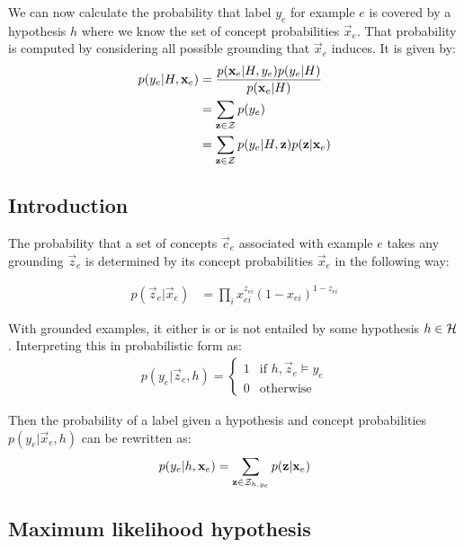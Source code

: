 We can now calculate the probability that label $y_e$ for example $e$ is covered by a hypothesis $h$ where we know the set of concept probabilities $\vec{x}_e$.
That probability is computed by considering all possible grounding that $\vec{x}_e$ induces.
It is given by:
\begin{align}
p(y_e|H, \textbf{x}_e)
& = \frac{p(\textbf{x}_e | H, y_e)p(y_e | H)}{p(\textbf{x}_e|H)} \\
& = \sum_{\textbf{z} \in \mathcal{Z}} p(y_e) \\
& = \sum_{\textbf{z} \in \mathcal{Z}} p(y_e|H, \textbf{z})
p(\textbf{z}| \textbf{x}_e)
\end{align}

\subsection{Introduction}




The probability that a set of concepts $\vec{c}_e$ associated with example $e$ takes any grounding $\vec{z}_e$ is determined by its concept probabilities $\vec{x}_{e}$ in the following way:

\begin{align}
p(\vec{z}_e | \vec{x}_e)
& = \prod_{i} x_{ei}^{z_{ei}} (1-x_{ei})^{1-z_{ei}}
\end{align}

With grounded examples, it either is or is not entailed by some hypothesis $h \in \mathcal{H}$.
Interpreting this in probabilistic form as:
\begin{align}
p(y_e | \vec{z}_e, h) =
\begin{cases}
1 & \text{if } h, \vec{z}_e \models y_e \\
0 & \text{otherwise}
\end{cases}
\end{align}



Then the probability of a label given a hypothesis and concept probabilities $p(y_e | \vec{x}_e, h)$ can be rewritten as:
\begin{align}
p(y_e|h, \textbf{x}_e)
= \sum_{\textbf{z} \in \mathcal{Z}_{h,y_e}}
p(\textbf{z}| \textbf{x}_e)
\end{align}

\subsection{Maximum likelihood hypothesis}

